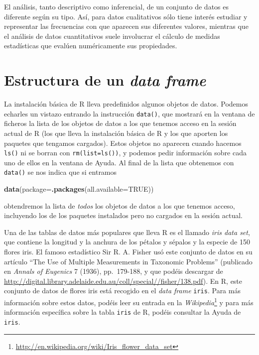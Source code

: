 \documentclass[
]{book}
\newenvironment{Shaded}{\begin{snugshade}}{\end{snugshade}}
\newcommand{\DataTypeTok}[1]{\textcolor[rgb]{0.13,0.29,0.53}{#1}}
\newcommand{\KeywordTok}[1]{\textcolor[rgb]{0.13,0.29,0.53}{\textbf{#1}}}
\newcommand{\NormalTok}[1]{#1}
\newcommand{\OtherTok}[1]{\textcolor[rgb]{0.56,0.35,0.01}{#1}}
\DeclareRobustCommand{\href}[2]{#2\footnote{\url{#1}}}
\theoremstyle{definition}
\theoremstyle{definition}
\theoremstyle{definition}
\theoremstyle{remark}
\begin{document}
El análisis, tanto descriptivo como inferencial, de un conjunto de datos es
diferente según su tipo. Así, para datos cualitativos sólo tiene interés estudiar y representar las frecuencias con que aparecen sus diferentes valores, mientras que el análisis de datos cuantitativos suele involucrar el cálculo de medidas estadísticas que evalúen numéricamente sus propiedades.

\hypertarget{estructura-de-un-data-frame}{%
\section{\texorpdfstring{Estructura de un \emph{data frame}}{Estructura de un data frame}}\label{estructura-de-un-data-frame}}

La instalación básica de R lleva predefinidos algunos objetos de datos.
Podemos echarles un vistazo entrando la instrucción \texttt{data()}, que mostrará en la ventana de ficheros la lista de los objetos de datos a los que tenemos acceso en la sesión actual de R (los que lleva la instalación básica de R y los que aporten los paquetes que tengamos cargados). Estos objetos no aparecen cuando hacemos \texttt{ls()} ni se borran con \texttt{rm(list=ls())}, y podemos pedir información sobre cada uno de ellos en la ventana de Ayuda. Al final de la lista que obtenemos con \texttt{data()} se nos indica que si entramos

\begin{Shaded}
\begin{Highlighting}[]
\KeywordTok{data}\NormalTok{(}\DataTypeTok{package=}\KeywordTok{.packages}\NormalTok{(}\DataTypeTok{all.available=}\OtherTok{TRUE}\NormalTok{))}
\end{Highlighting}
\end{Shaded}

obtendremos la lista de \emph{todos} los objetos de datos a los que tenemos acceso, incluyendo los de los paquetes instalados pero no cargados en la sesión actual.

Una de las tablas de datos más populares que lleva R es el llamado \emph{iris data set}, que contiene la longitud y la anchura de los pétalos y sépalos y la especie de 150 flores iris. El famoso estadístico Sir R. A. Fisher usó este conjunto de datos en su artículo ``The Use of Multiple Measurements in Taxonomic Problems'' (publicado en \emph{Annals of Eugenics} 7 (1936), pp.~179-188, y que podéis descargar de \url{http://digital.library.adelaide.edu.au/coll/special//fisher/138.pdf}). En R, este conjunto de datos de flores iris está recogido en el \emph{data frame} \texttt{iris}. Para más información sobre estos datos, podéis leer su \href{http://en.wikipedia.org/wiki/Iris_flower_data_set}{entrada en la \emph{Wikipedia}} y para más información específica sobre la tabla \texttt{iris} de R, podéis consultar la Ayuda de \texttt{iris}.
\end{document}
